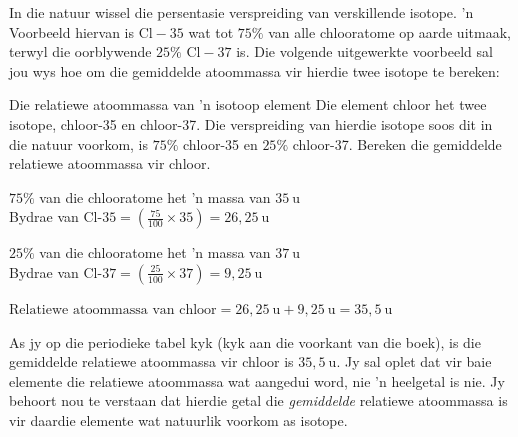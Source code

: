 In die natuur wissel die persentasie verspreiding van verskillende isotope.  'n Voorbeeld hiervan is $\text{Cl}-35$ wat tot $75\%$ van alle chlooratome op aarde uitmaak, terwyl die oorblywende $25\%$ $\text{Cl}-37$ is. Die volgende uitgewerkte voorbeeld sal jou wys
hoe om die gemiddelde atoommassa vir hierdie twee isotope te bereken: \par  
\begin{wex}{Die relatiewe atoommassa van 'n isotoop element}{
Die element chloor het twee isotope, chloor-35 en chloor-37. Die verspreiding van hierdie isotope soos dit in die natuur voorkom, is $75\%$ chloor-35 en $25\%$ chloor-37. Bereken die gemiddelde relatiewe atoommassa vir chloor.
}
{
$75\%$ van die chlooratome het 'n massa van $35~\text{u}$ \\
Bydrae van $\text{Cl-}35 = (\frac{75}{100} \times 35) = 26,25~\text{u}$

$25\%$ van die chlooratome het 'n massa van $37~\text{u}$ \\ 
Bydrae van $\text{Cl-}37 = (\frac{25}{100} \times 37) = 9,25~\text{u}$


$\text{Relatiewe atoommassa van chloor} = 26,25~\text{u} + 9,25~\text{u} = 35,5~\text{u}$ \\
}
\end{wex}
As jy op die periodieke tabel kyk (kyk aan die voorkant van die boek), is die gemiddelde relatiewe atoommassa vir chloor is $35,5~\text{u}$. Jy sal oplet dat vir baie elemente die relatiewe atoommassa wat aangedui word, nie 'n heelgetal is nie. Jy behoort nou te verstaan ​dat hierdie getal die \textsl{gemiddelde} relatiewe atoommassa is vir daardie elemente wat natuurlik voorkom as isotope.\par




